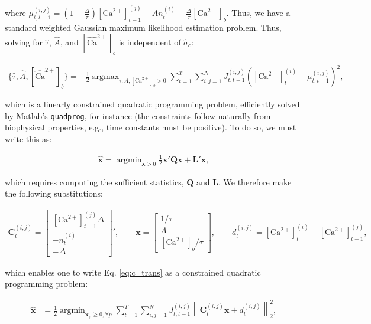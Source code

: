 \documentclass[10pt]{article}
\providecommand{\ve}[1]{\boldsymbol{#1}}
\providecommand{\norm}[1]{\left \lVert#1 \right  \rVert}
\providecommand{\ve}[1]{\boldsymbol{#1}}
\DeclareMathOperator*{\argmax}{argmax}
\DeclareMathOperator*{\argmin}{argmin}
\newcommand{\Ca}{[\text{Ca}^{2+}]}
\newcommand{\wCab}{[\widehat{\text{Ca}}^{2+}]_b}
\begin{document}
\noindent where $\mu_{t,t-1}^{(i,j)}= (1 - \frac{\Delta}{\tau}) \Ca_{t-1}^{(j)} - A n_t^{(i)} - \frac{\Delta}{\tau} \Ca_b$.  Thus, we have a standard weighted Gaussian maximum likelihood estimation problem.  Thus, solving for $\widehat{\tau}$, $\widehat{A}$, and $\wCab$ is independent of $\widehat{\sigma}_c$:

\begin{align} \label{eq:c_trans}
\{\widehat{\tau}, \widehat{A}, \wCab\} = -\frac{1}{2}  \argmax_{\tau, A, \Ca_b > 0} \sum_{t=1}^T \sum_{i,j=1}^N  J^{(i,j)}_{t,t-1} \left(\Ca_t^{(i)} - \mu_{t,t-1}^{(i,j)} \right)^2,
\end{align}

\noindent which is a linearly constrained quadratic programming problem, efficiently solved by Matlab's \texttt{quadprog}, for instance (the constraints follow naturally from biophysical properties, e.g., time constants must be positive). To do so, we must write this as:

\begin{align} \label{eq:quadprog}
\widehat{\ve{x}} = \argmin_{\ve{x} > 0} \frac{1}{2}\ve{x}' \ve{Q} \ve{x} + \ve{L}' \ve{x},
\end{align}

\noindent which requires computing the sufficient statistics, $\ve{Q}$ and $\ve{L}$.  We therefore make the following substitutions:

\begin{align} \label{eq:param_def}
\ve{C}^{(i,j)}_t=
{\begin{bmatrix} \Ca_{t-1}^{(j)} \Delta \\ -n_t^{(i)} \\ -\Delta \end{bmatrix}}',
\qquad \ve{x}= \begin{bmatrix} 1/\tau \\ A \\ \Ca_b/\tau \end{bmatrix},
\qquad d^{(i,j)}_t= \Ca_t^{(i)} -\Ca_{t-1}^{(j)},
\end{align}

\noindent which enables one to write Eq. \ref{eq:c_trans} as a constrained quadratic programming problem:

\begin{equation}
\begin{split}
\widehat{\ve{x}} &= \frac{1}{2}  \argmin_{\ve{x_p} \geq 0, \forall p} \sum_{t=1}^T \sum_{i,j=1}^N J^{(i,j)}_{t,t-1}  \norm{\ve{C}^{(i,j)}_t \ve{x} + d^{(i,j)}_t}_2^2,
\end{split}
\end{equation}
\end{document}

